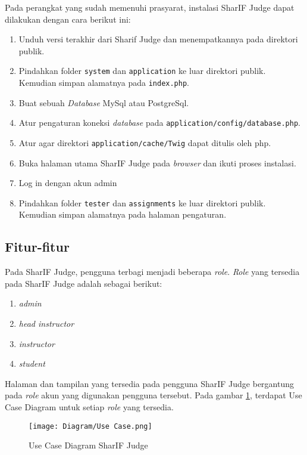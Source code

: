 Pada perangkat yang sudah memenuhi prasyarat, instalasi SharIF Judge dapat dilakukan dengan cara berikut ini:
\begin{enumerate}
    \item Unduh versi terakhir dari Sharif Judge dan menempatkannya pada direktori publik.
    \item Pindahkan folder \texttt{system} dan \texttt{application} ke luar direktori publik. Kemudian simpan alamatnya pada \texttt{index.php}.
    \item Buat sebuah \textit{Database} MySql atau PostgreSql.
    \item Atur pengaturan koneksi \textit{database} pada \texttt{application/config/database.php}.
    \item Atur agar direktori \texttt{application/cache/Twig} dapat ditulis oleh php.
    \item Buka halaman utama SharIF Judge pada \textit{browser} dan ikuti proses instalasi.
    \item Log in dengan akun admin
    \item Pindahkan folder \texttt{tester} dan \texttt{assignments} ke luar direktori publik. Kemudian simpan alamatnya pada halaman pengaturan.
\end{enumerate}


\subsection{Fitur-fitur}
\label{subs:2:fitur}

Pada SharIF Judge, pengguna terbagi menjadi beberapa \textit{role}. \textit{Role} yang tersedia pada SharIF Judge adalah sebagai berikut:
\begin{enumerate}
    \item \textit{admin}
    \item \textit{head instructor}
    \item \textit{instructor}
    \item \textit{student}
\end{enumerate}

Halaman dan tampilan yang tersedia pada pengguna SharIF Judge bergantung pada \textit{role} akun yang digunakan pengguna tersebut. Pada gambar \ref{fig:2:usecased}, terdapat Use Case Diagram untuk setiap \textit{role} yang tersedia. 

\begin{figure}[H]
	\centering  
	\texttt{[image: Diagram/Use Case.png]}  
	\caption{Use Case Diagram SharIF Judge}
	\label{fig:2:usecased} 
\end{figure} 

